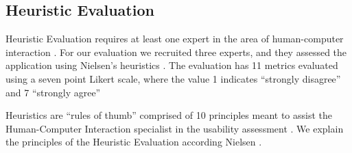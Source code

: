 \documentclass[twocolumn]{bmcart}%
\begin{document}
\subsection*{Heuristic Evaluation}

Heuristic Evaluation requires at least one expert in the area of human-computer interaction \cite{nielsen1994usability, johnson2011ehr}. For our evaluation we recruited three experts, and they assessed the application using Nielsen's heuristics \cite{nielsen1994usability}. The evaluation has 11 metrics evaluated using a seven point Likert scale, where the value 1 indicates ``strongly disagree'' and 7 ``strongly agree''


Heuristics are ``rules of thumb'' comprised of 10 principles meant to assist the Human-Computer Interaction specialist in the usability assessment \cite{johnson2011ehr, Nielsen10UsabilityHeuristics}. We explain the principles of the Heuristic Evaluation according Nielsen \cite{Nielsen10UsabilityHeuristics}.
\end{document}
